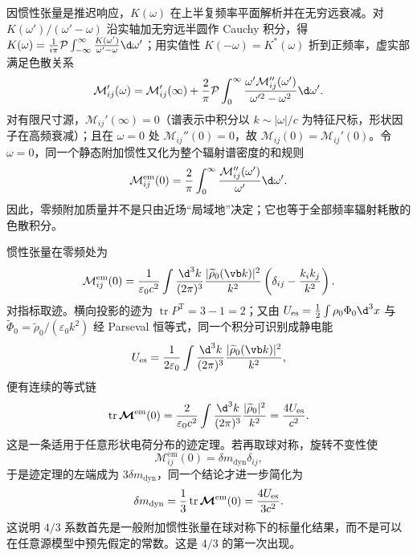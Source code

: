 因惯性张量是推迟响应，$K(\omega)$ 在上半复频率平面解析并在无穷远衰减。对 $K(\omega')/(\omega'-\omega)$ 沿实轴加无穷远半圆作 Cauchy 积分，得 $K(\omega)=\frac{1}{i\pi}\mathcal P\int_{-\infty}^{\infty}\frac{K(\omega')}{\omega'-\omega}\d\omega'$；用实值性 $K(-\omega)=K^*(\omega)$ 折到正频率，虚实部满足色散关系
\begin{equation*}
 \mathcal M_{ij}'(\omega)
 =\mathcal M_{ij}'(\infty)
 +{2\over\pi}\mathcal P\int_0^\infty
 {\omega'\mathcal M_{ij}''(\omega')\over\omega'^2-\omega^2}\d\omega'.
\end{equation*}
对有限尺寸源，$\mathcal M_{ij}'(\infty)=0$（谱表示中积分以 $k\sim|\omega|/c$ 为特征尺标，形状因子在高频衰减）；且在 $\omega=0$ 处 $\mathcal M_{ij}''(0)=0$，故 $\mathcal M_{ij}(0)=\mathcal M_{ij}'(0)$。令 $\omega=0$，同一个静态附加惯性又化为整个辐射谱密度的和规则
\begin{equation*}
 \mathcal M_{ij}^{\mathrm{em}}(0)
 ={2\over\pi}\int_0^\infty
 {\mathcal M_{ij}''(\omega')\over\omega'}\d\omega'.
\end{equation*}
因此，零频附加质量并不是只由近场“局域地”决定；它也等于全部频率辐射耗散的色散积分。

惯性张量在零频处为
\begin{equation*}
 \mathcal M_{ij}^{\mathrm{em}}(0)
 ={1\over\varepsilon_0c^2}
 \int{\d^3k\over(2\pi)^3}
 {|\widetilde\rho_0(\vb k)|^2\over k^2}
 \left(\delta_{ij}-{k_i k_j\over k^2}\right).
\end{equation*}
对指标取迹。横向投影的迹为 $\operatorname{tr}P^{\mathrm T}=3-1=2$；又由 $U_{\mathrm{es}}=\frac12\int\rho_0\Phi_0\d^3x$ 与 $\widetilde\Phi_0=\widetilde\rho_0/(\varepsilon_0k^2)$ 经 Parseval 恒等式，同一个积分可识别成静电能
\begin{equation*}
 U_{\mathrm{es}}
 ={1\over2\varepsilon_0}
 \int{\d^3k\over(2\pi)^3}{|\widetilde\rho_0(\vb k)|^2\over k^2},
\end{equation*}
便有连续的等式链
\begin{equation*}
 \operatorname{tr}\boldsymbol{\mathcal M}^{\mathrm{em}}(0)
 ={2\over\varepsilon_0c^2}
 \int{\d^3k\over(2\pi)^3}{|\widetilde\rho_0|^2\over k^2}
 ={4U_{\mathrm{es}}\over c^2}.
\end{equation*}
这是一条适用于任意形状电荷分布的迹定理。若再取球对称，旋转不变性使
\begin{equation*}
 \mathcal M_{ij}^{\mathrm{em}}(0)=\delta m_{\mathrm{dyn}}\delta_{ij},
\end{equation*}
于是迹定理的左端成为 $3\delta m_{\mathrm{dyn}}$，同一个结论才进一步简化为
\begin{equation*}
 \delta m_{\mathrm{dyn}}
 ={1\over3}\operatorname{tr}\boldsymbol{\mathcal M}^{\mathrm{em}}(0)
 ={4U_{\mathrm{es}}\over3c^2}.
\end{equation*}
这说明 $4/3$ 系数首先是一般附加惯性张量在球对称下的标量化结果，而不是可以在任意源模型中预先假定的常数。这是 $4/3$ 的第一次出现。

